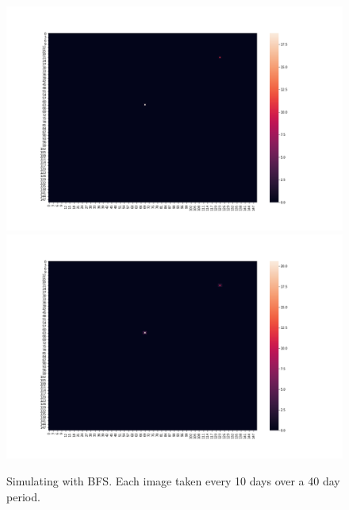 \documentclass[a4paper]{article}
\begin{document}
\begin{figure}[ht]
  \caption{Simulating with BFS. Each image taken every 10 days over a
  40 day period.}
  \includegraphics[scale=0.15]{../quarantine/quarantine_heatmap_0.png}
  \centering
  \includegraphics[scale=0.15]{../quarantine/quarantine_heatmap_1.png}
  \centering
\end{figure}
\end{document}
